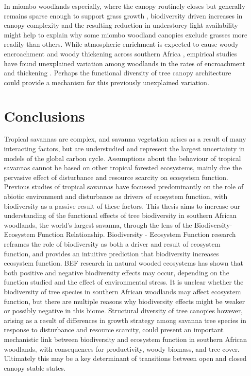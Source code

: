 \begin{refsection}
In miombo woodlands especially, where the canopy routinely closes but generally remains sparse enough to support grass growth \citep{Frost1996}, biodiversity driven increases in canopy complexity and the resulting reduction in understorey light availability might help to explain why some miombo woodland canopies exclude grasses more readily than others. While atmospheric \co{} enrichment is expected to cause woody encroachment and woody thickening across southern Africa \citep{Stevens2016b}, empirical studies have found unexplained variation among woodlands in the rates of encroachment and thickening \citep{Lewis2009}. Perhaps the functional diversity of tree canopy architecture could provide a mechanism for this previously unexplained variation. 

\section{Conclusions}
\label{background:sec:conclusion}

Tropical savannas are complex, and savanna vegetation arises as a result of many interacting factors, but are understudied and represent the largest uncertainty in models of the global carbon cycle. Assumptions about the behaviour of tropical savannas cannot be based on other tropical forested ecosystems, mainly due the pervasive effect of disturbance and resource scarcity on ecosystem function. Previous studies of tropical savannas have focussed predominantly on the role of abiotic environment and disturbance as drivers of ecosystem function, with biodiversity as a passive result of these factors. This thesis aims to increase our understanding of the functional effects of tree biodiversity in southern African woodlands, the world's largest savanna, through the lens of the Biodiversity-Ecosystem Function Relationship. Biodiversity - Ecosystem Function research reframes the role of biodiversity as both a driver and result of ecosystem function, and provides an intuitive prediction that biodiversity increases ecosystem function. BEF research in natural wooded ecosystems has shown that both positive and negative biodiversity effects may occur, depending on the function studied and the effect of environmental stress. It is unclear whether the biodiversity of tree species in southern African woodlands may affect ecosystem function, but there are multiple reasons why biodiversity effects might be weaker or possibly negative in this biome. Structural diversity of tree canopies however, arising as a result of differences in growth strategy among savanna tree species in response to disturbance and resource scarcity, could present an important mechanistic link between biodiversity and ecosystem function in southern African woodlands, with consequences for productivity, woody biomass, and tree cover. Ultimately this may be a key determinant of transitions between open and closed canopy stable states. 

\newpage{}
\begingroup
{}
\printbibliography[heading=subbibintoc]
\endgroup

\end{refsection}

